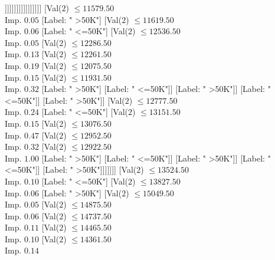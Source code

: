 \documentclass[margin=10pt]{standalone}
\begin{document}
\begin{forest}
																																		[Label: " >50K"]
																																		[Label: " <=50K"]]]]]]]]]]]]]]]]]
																		[Val($2$) $ \leq 11579.50$ \\ Imp. $0.05$
																			[Label: " >50K"]
																			[Val($2$) $ \leq 11619.50$ \\ Imp. $0.06$
																				[Label: " <=50K"]
																				[Val($2$) $ \leq 12536.50$ \\ Imp. $0.05$
																					[Val($2$) $ \leq 12286.50$ \\ Imp. $0.13$
																						[Val($2$) $ \leq 12261.50$ \\ Imp. $0.19$
																							[Val($2$) $ \leq 12075.50$ \\ Imp. $0.15$
																								[Val($2$) $ \leq 11931.50$ \\ Imp. $0.32$
																									[Label: " >50K"]
																									[Label: " <=50K"]]
																								[Label: " >50K"]]
																							[Label: " <=50K"]]
																						[Label: " >50K"]]
																					[Val($2$) $ \leq 12777.50$ \\ Imp. $0.24$
																						[Label: " <=50K"]
																						[Val($2$) $ \leq 13151.50$ \\ Imp. $0.15$
																							[Val($2$) $ \leq 13076.50$ \\ Imp. $0.47$
																								[Val($2$) $ \leq 12952.50$ \\ Imp. $0.32$
																									[Val($2$) $ \leq 12922.50$ \\ Imp. $1.00$
																										[Label: " >50K"]
																										[Label: " <=50K"]]
																									[Label: " >50K"]]
																								[Label: " <=50K"]]
																							[Label: " >50K"]]]]]]]
																	[Val($2$) $ \leq 13524.50$ \\ Imp. $0.10$
																		[Label: " <=50K"]
																		[Val($2$) $ \leq 13827.50$ \\ Imp. $0.06$
																			[Label: " >50K"]
																			[Val($2$) $ \leq 15049.50$ \\ Imp. $0.05$
																				[Val($2$) $ \leq 14875.50$ \\ Imp. $0.06$
																					[Val($2$) $ \leq 14737.50$ \\ Imp. $0.11$
																						[Val($2$) $ \leq 14465.50$ \\ Imp. $0.10$
																							[Val($2$) $ \leq 14361.50$ \\ Imp. $0.14$

\end{forest}
\end{document}
